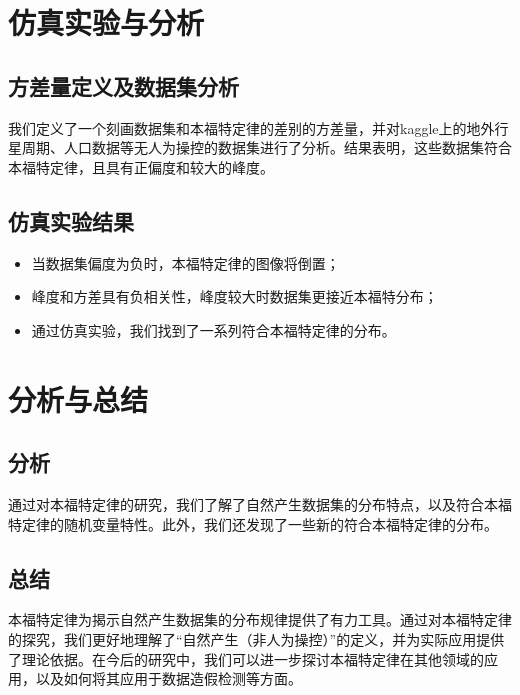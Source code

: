 \documentclass{ctexart} %
\begin{document}
\section{仿真实验与分析}

\subsection{方差量定义及数据集分析}

我们定义了一个刻画数据集和本福特定律的差别的方差量，并对kaggle上的地外行星周期、人口数据等无人为操控的数据集进行了分析。结果表明，这些数据集符合本福特定律，且具有正偏度和较大的峰度。

\subsection{仿真实验结果}

\begin{itemize}
    \item 当数据集偏度为负时，本福特定律的图像将倒置；
    \item 峰度和方差具有负相关性，峰度较大时数据集更接近本福特分布；
    \item 通过仿真实验，我们找到了一系列符合本福特定律的分布。
\end{itemize}

\section{分析与总结}

\subsection{分析}

通过对本福特定律的研究，我们了解了自然产生数据集的分布特点，以及符合本福特定律的随机变量特性。此外，我们还发现了一些新的符合本福特定律的分布。

\subsection{总结}

本福特定律为揭示自然产生数据集的分布规律提供了有力工具。通过对本福特定律的探究，我们更好地理解了“自然产生（非人为操控）”的定义，并为实际应用提供了理论依据。在今后的研究中，我们可以进一步探讨本福特定律在其他领域的应用，以及如何将其应用于数据造假检测等方面。
\end{document}
